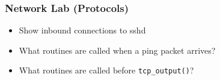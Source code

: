 \documentclass[pdftex]{beamer}
\begin{document}
\begin{frame}[fragile]
  \frametitle{Network Lab (Protocols)}
  \begin{itemize}
  \item Show inbound connections to sshd
  \item What routines are called when a ping packet arrives?
  \item What routines are called before \verb+tcp_output()+?
  \end{itemize}
\end{frame}
\end{document}
